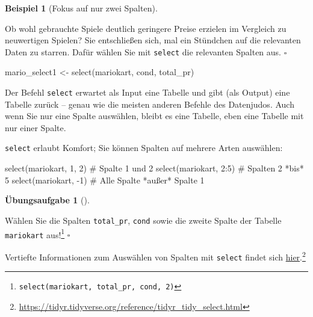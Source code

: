 \documentclass[
  letterpaper,
  oneside,
  open=any]{scrbook}
\newenvironment{Shaded}{\begin{snugshade}}{\end{snugshade}}
\newcommand{\CommentTok}[1]{\textcolor[rgb]{0.37,0.37,0.37}{#1}}
\newcommand{\DecValTok}[1]{\textcolor[rgb]{0.68,0.00,0.00}{#1}}
\newcommand{\FunctionTok}[1]{\textcolor[rgb]{0.28,0.35,0.67}{#1}}
\newcommand{\NormalTok}[1]{\textcolor[rgb]{0.00,0.23,0.31}{#1}}
\newcommand{\OtherTok}[1]{\textcolor[rgb]{0.00,0.23,0.31}{#1}}
\newcommand{\SpecialCharTok}[1]{\textcolor[rgb]{0.37,0.37,0.37}{#1}}
\theoremstyle{definition}
\newtheorem{exercise}{Übungsaufgabe}[chapter]
\theoremstyle{definition}
\newtheorem{example}{Beispiel}[chapter]
\theoremstyle{definition}
\theoremstyle{remark}
\begin{document}
\begin{example}[Fokus auf nur zwei
Spalten]\protect\hypertarget{exm-select}{}\label{exm-select}

Ob wohl gebrauchte Spiele deutlich geringere Preise erzielen im
Vergleich zu neuwertigen Spielen? Sie entschließen sich, mal ein
Stündchen auf die relevanten Daten zu starren. Dafür wählen Sie mit
\texttt{select} die relevanten Spalten aus. \(\square\)

\end{example}

\begin{Shaded}
\begin{Highlighting}[]
\NormalTok{mario\_select1 }\OtherTok{\textless{}{-}} \FunctionTok{select}\NormalTok{(mariokart, cond, total\_pr)}
\end{Highlighting}
\end{Shaded}

Der Befehl \texttt{select} erwartet als Input eine Tabelle und gibt (als
Output) eine Tabelle zurück -- genau wie die meisten anderen Befehle des
Datenjudos. Auch wenn Sie nur eine Spalte auswählen, bleibt es eine
Tabelle, eben eine Tabelle mit nur einer Spalte.

\texttt{select} erlaubt Komfort; Sie können Spalten auf mehrere Arten
auswählen:

\begin{Shaded}
\begin{Highlighting}[]
\FunctionTok{select}\NormalTok{(mariokart, }\DecValTok{1}\NormalTok{, }\DecValTok{2}\NormalTok{)  }\CommentTok{\# Spalte 1 und 2}
\FunctionTok{select}\NormalTok{(mariokart, }\DecValTok{2}\SpecialCharTok{:}\DecValTok{5}\NormalTok{)  }\CommentTok{\#  Spalten 2 *bis* 5 }
\FunctionTok{select}\NormalTok{(mariokart, }\SpecialCharTok{{-}}\DecValTok{1}\NormalTok{)  }\CommentTok{\# Alle Spalte *außer* Spalte 1}
\end{Highlighting}
\end{Shaded}

\begin{exercise}[]\protect\hypertarget{exr-select}{}\label{exr-select}

Wählen Sie die Spalten \texttt{total\_pr}, \texttt{cond} sowie die
zweite Spalte der Tabelle \texttt{mariokart} aus!\footnote{\texttt{select(mariokart,\ total\_pr,\ cond,\ 2)}}
\(\square\)

\end{exercise}

Vertiefte Informationen zum Auswählen von Spalten mit \texttt{select}
findet sich
\href{https://tidyr.tidyverse.org/reference/tidyr_tidy_select.html}{hier}.\footnote{\url{https://tidyr.tidyverse.org/reference/tidyr_tidy_select.html}}
\end{document}
